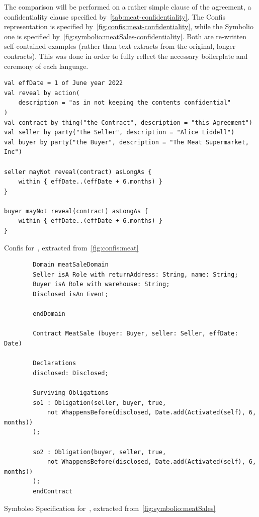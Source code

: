The comparison will be performed on a rather simple clause of the agreement, a confidentiality clause specified by~\autoref{tab:meat-confidentiality}.
The Confis representation is specified by~\autoref{fig:confis:meat-confidentiality}, while the Symbolio one is specified by~\autoref{fig:symbolio:meatSales-confidentiality}.
Both are re-written self-contained examples (rather than text extracts from the original, longer contracts).
This was done in order to fully reflect the necessary boilerplate and ceremony of each language.


\begin{listing}[h]
    \centering
    \begin{verbatim}
val effDate = 1 of June year 2022
val reveal by action(
    description = "as in not keeping the contents confidential"
)
val contract by thing("the Contract", description = "this Agreement")
val seller by party("the Seller", description = "Alice Liddell")
val buyer by party("the Buyer", description = "The Meat Supermarket, Inc")

seller mayNot reveal(contract) asLongAs {
    within { effDate..(effDate + 6.months) }
}

buyer mayNot reveal(contract) asLongAs {
    within { effDate..(effDate + 6.months) }
}
    \end{verbatim}
    \caption{Confis for~, extracted from~\autoref{fig:confis:meat}}
    \label{fig:confis:meat-confidentiality}
\end{listing}

\begin{listing}[h]
    \begin{verbatim}
        Domain meatSaleDomain
        Seller isA Role with returnAddress: String, name: String;
        Buyer isA Role with warehouse: String;
        Disclosed isAn Event;

        endDomain

        Contract MeatSale (buyer: Buyer, seller: Seller, effDate: Date)

        Declarations
        disclosed: Disclosed;

        Surviving Obligations
        so1 : Obligation(seller, buyer, true,
            not WhappensBefore(disclosed, Date.add(Activated(self), 6, months))
        );

        so2 : Obligation(buyer, seller, true,
            not WhappensBefore(disclosed, Date.add(Activated(self), 6, months))
        );
        endContract
    \end{verbatim}
    \caption{Symboleo Specification for~, extracted from~\autoref{fig:symbolio:meatSales}}
    \label{fig:symbolio:meatSales-confidentiality}
\end{listing}

